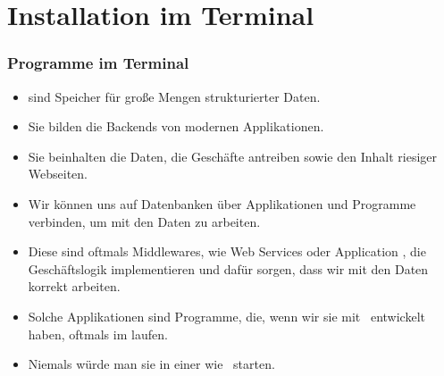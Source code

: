 \documentclass[aspectratio=169,mathserif,notheorems]{beamer}%
\begin{document}
\section{Installation im Terminal}%
%
\begin{frame}%
\frametitle{Programme im Terminal}%
\begin{itemize}%
\item {} sind Speicher für große Mengen strukturierter Daten.%
\item<2-> Sie bilden die Backends von modernen Applikationen.%
\item<3-> Sie beinhalten die Daten, die Geschäfte antreiben sowie den Inhalt riesiger Webseiten.%
\item<4-> Wir können uns auf Datenbanken über Applikationen und Programme verbinden, um mit den Daten zu arbeiten.%
\item<5-> Diese sind oftmals Middlewares, wie Web Services oder Application , die Geschäftslogik implementieren und dafür sorgen, dass wir mit den Daten korrekt arbeiten.%
\item<6-> Solche Applikationen sind Programme, die, wenn wir sie mit \python\ entwickelt haben, oftmals im  laufen.%
\item<7-> Niemals würde man sie in einer  wie \pycharm\ starten.%
\end{itemize}%
%
\end{frame}%
%
\end{document}
